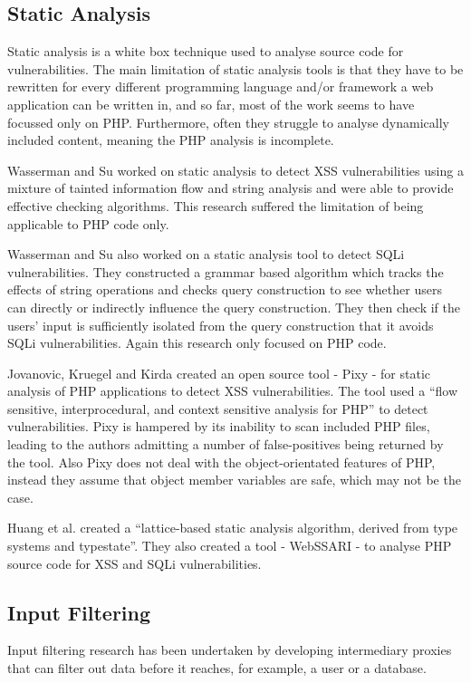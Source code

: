 \documentclass[12pt,a4paper]{article}
\begin{document}
\subsection{Static Analysis}
Static analysis is a white box technique used to analyse source code for vulnerabilities.  The main limitation of static analysis tools is that they have to be rewritten for every different programming language and/or framework a web application can be written in, and so far, most of the work seems to have focussed only on PHP.  Furthermore, often they struggle to analyse dynamically included content, meaning the PHP analysis is incomplete.

Wasserman and Su worked on static analysis to detect XSS vulnerabilities using a mixture of tainted information flow and  string analysis and were able to provide effective checking algorithms. This research suffered the limitation of being applicable to PHP code only.  \cite{Wassermann2008}

Wasserman and Su also worked on a static analysis tool to detect SQLi vulnerabilities.  They constructed a grammar based algorithm which tracks the effects of string operations and checks query construction to see whether users can directly or indirectly influence the query construction.   They then check if the users’ input is sufficiently  isolated from the query construction that it avoids SQLi vulnerabilities. Again this research only focused on PHP code. \cite{Wassermann2007}

Jovanovic, Kruegel and  Kirda created an open source tool - Pixy - for static analysis of PHP applications to detect XSS vulnerabilities.  The tool used a “flow sensitive, interprocedural, and context sensitive analysis for PHP” to detect vulnerabilities. \cite{Jovanovic2006}  Pixy is hampered by its inability to scan included PHP files, leading to the authors admitting a number of false-positives being returned by the tool.  Also Pixy does not deal with the object-orientated features of PHP, instead they assume that object member variables are safe, which may not be the case.

Huang et al. created a “lattice-based static analysis algorithm, derived from type systems and typestate”.  They also created a tool - WebSSARI - to analyse PHP source code for XSS and SQLi vulnerabilities. \cite{Huang2004}

\subsection{Input Filtering}
Input filtering research has been undertaken by developing intermediary proxies that can filter out data before it reaches, for example, a user or a database.
\end{document}

